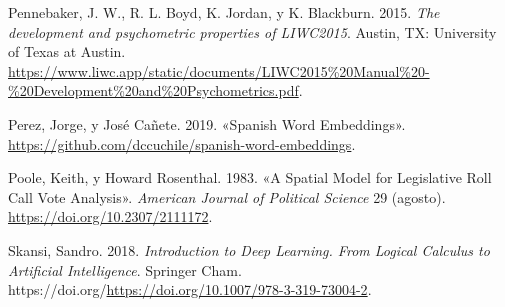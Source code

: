 \documentclass[
  12pt,
]{article}
\newlength{\cslhangindent}
\newlength{\cslentryspacingunit} %
\newenvironment{CSLReferences}[2] %
 {%
  \setlength{\parindent}{0pt}
  \ifodd #1
  \let\oldpar\par
  \def\par{\hangindent=\cslhangindent\oldpar}
  \fi
  \setlength{\parskip}{#2\cslentryspacingunit}
 }%
 {}
\begin{document}
\begin{CSLReferences}{1}{0}
\leavevmode{}%
Pennebaker, J. W., R. L. Boyd, K. Jordan, y K. Blackburn. 2015.
\emph{The development and psychometric properties of LIWC2015}. Austin,
TX: University of Texas at Austin.
\url{https://www.liwc.app/static/documents/LIWC2015\%20Manual\%20-\%20Development\%20and\%20Psychometrics.pdf}.

\leavevmode{}%
Perez, Jorge, y José Cañete. 2019. {«Spanish Word Embeddings»}.
\url{https://github.com/dccuchile/spanish-word-embeddings}.

\leavevmode{}%
Poole, Keith, y Howard Rosenthal. 1983. {«A Spatial Model for
Legislative Roll Call Vote Analysis»}. \emph{American Journal of
Political Science} 29 (agosto). \url{https://doi.org/10.2307/2111172}.

\leavevmode{}%
Skansi, Sandro. 2018. \emph{Introduction to Deep Learning. From Logical
Calculus to Artificial Intelligence}. Springer Cham.
https://doi.org/\url{https://doi.org/10.1007/978-3-319-73004-2}.

\end{CSLReferences}
\end{document}
